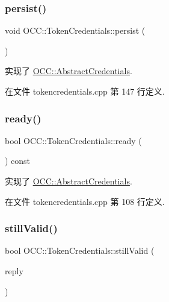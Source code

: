 \subsubsection{\texorpdfstring{persist()}{persist()}}
{\footnotesize\ttfamily void O\+C\+C\+::\+Token\+Credentials\+::persist (\begin{DoxyParamCaption}{ }\end{DoxyParamCaption})\hspace{0.3cm}{\ttfamily [virtual]}}



实现了 \hyperlink{class_o_c_c_1_1_abstract_credentials_ab4af03be7d9e7e330345b8f13e67a544}{O\+C\+C\+::\+Abstract\+Credentials}.



在文件 tokencredentials.\+cpp 第 147 行定义.

\mbox{\label{class_o_c_c_1_1_token_credentials_aa6e69c01e9e6463650d169aae84393e8}} 
\subsubsection{\texorpdfstring{ready()}{ready()}}
{\footnotesize\ttfamily bool O\+C\+C\+::\+Token\+Credentials\+::ready (\begin{DoxyParamCaption}{ }\end{DoxyParamCaption}) const\hspace{0.3cm}{\ttfamily [virtual]}}



实现了 \hyperlink{class_o_c_c_1_1_abstract_credentials_a77adad4957e0365be40db7fe4499a86b}{O\+C\+C\+::\+Abstract\+Credentials}.



在文件 tokencredentials.\+cpp 第 108 行定义.

\mbox{\label{class_o_c_c_1_1_token_credentials_a6d0a8caf7e4b1b7f54890301cb7e30ef}} 
\subsubsection{\texorpdfstring{still\+Valid()}{stillValid()}}
{\footnotesize\ttfamily bool O\+C\+C\+::\+Token\+Credentials\+::still\+Valid (\begin{DoxyParamCaption}\item[{Q\+Network\+Reply $\ast$}]{reply }\end{DoxyParamCaption})\hspace{0.3cm}{\ttfamily [virtual]}}



